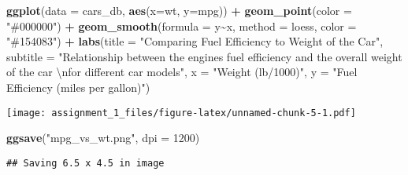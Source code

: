 \documentclass[
]{article}
\newenvironment{Shaded}{\begin{snugshade}}{\end{snugshade}}
\newcommand{\CharTok}[1]{\textcolor[rgb]{0.31,0.60,0.02}{#1}}
\newcommand{\DataTypeTok}[1]{\textcolor[rgb]{0.13,0.29,0.53}{#1}}
\newcommand{\DecValTok}[1]{\textcolor[rgb]{0.00,0.00,0.81}{#1}}
\newcommand{\KeywordTok}[1]{\textcolor[rgb]{0.13,0.29,0.53}{\textbf{#1}}}
\newcommand{\NormalTok}[1]{#1}
\newcommand{\OperatorTok}[1]{\textcolor[rgb]{0.81,0.36,0.00}{\textbf{#1}}}
\newcommand{\StringTok}[1]{\textcolor[rgb]{0.31,0.60,0.02}{#1}}
\begin{document}
\begin{Shaded}
\begin{Highlighting}[]
\KeywordTok{ggplot}\NormalTok{(}\DataTypeTok{data =}\NormalTok{ cars\_db, }\KeywordTok{aes}\NormalTok{(}\DataTypeTok{x=}\NormalTok{wt, }\DataTypeTok{y=}\NormalTok{mpg)) }\OperatorTok{+}\StringTok{ }\KeywordTok{geom\_point}\NormalTok{(}\DataTypeTok{color =} \StringTok{"\#000000"}\NormalTok{) }\OperatorTok{+}
\StringTok{  }\KeywordTok{geom\_smooth}\NormalTok{(}\DataTypeTok{formula =}\NormalTok{ y}\OperatorTok{\textasciitilde{}}\NormalTok{x, }\DataTypeTok{method =} \StringTok{\textquotesingle{}loess\textquotesingle{}}\NormalTok{, }\DataTypeTok{color =} \StringTok{"\#154083"}\NormalTok{) }\OperatorTok{+}
\StringTok{  }\KeywordTok{labs}\NormalTok{(}\DataTypeTok{title =} \StringTok{"Comparing Fuel Efficiency to Weight of the Car"}\NormalTok{,}
       \DataTypeTok{subtitle =} \StringTok{"Relationship between the engine\textquotesingle{}s fuel efficiency and the overall weight of the car }\CharTok{\textbackslash{}n}\StringTok{for different car models"}\NormalTok{,}
       \DataTypeTok{x =} \StringTok{"Weight (lb/1000)"}\NormalTok{,}
       \DataTypeTok{y =} \StringTok{"Fuel Efficiency (miles per gallon)"}\NormalTok{)}
\end{Highlighting}
\end{Shaded}

\texttt{[image: assignment\_1\_files/figure-latex/unnamed-chunk-5-1.pdf]}

\begin{Shaded}
\begin{Highlighting}[]
\KeywordTok{ggsave}\NormalTok{(}\StringTok{"mpg\_vs\_wt.png"}\NormalTok{, }\DataTypeTok{dpi =} \DecValTok{1200}\NormalTok{)}
\end{Highlighting}
\end{Shaded}

\begin{verbatim}
## Saving 6.5 x 4.5 in image
\end{verbatim}
\end{document}

